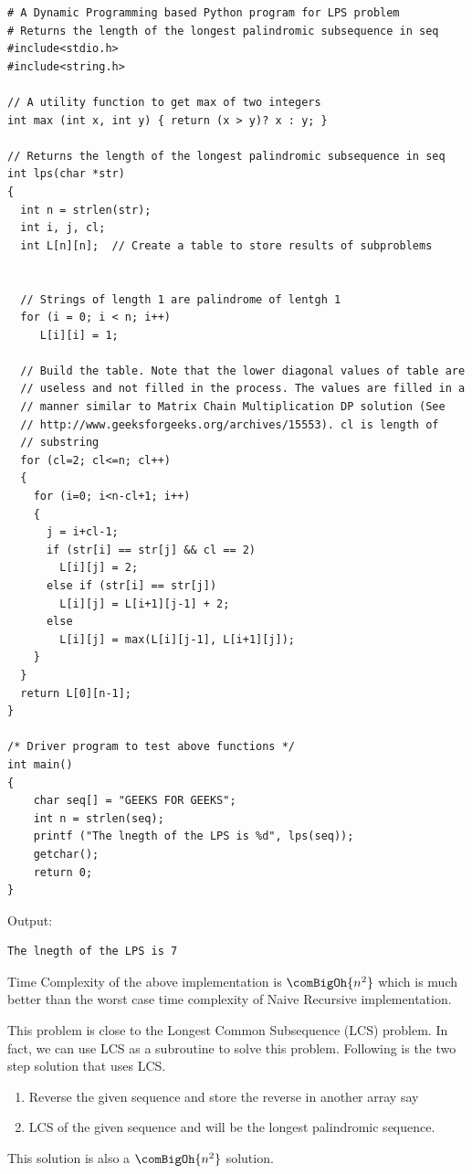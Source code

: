 
\begin{lstlisting}[style=raycppnewsnippet]
# A Dynamic Programming based Python program for LPS problem
# Returns the length of the longest palindromic subsequence in seq
#include<stdio.h>
#include<string.h>
 
// A utility function to get max of two integers
int max (int x, int y) { return (x > y)? x : y; }
 
// Returns the length of the longest palindromic subsequence in seq
int lps(char *str)
{
  int n = strlen(str);
  int i, j, cl;
  int L[n][n];  // Create a table to store results of subproblems
 
 
  // Strings of length 1 are palindrome of lentgh 1
  for (i = 0; i < n; i++)
     L[i][i] = 1;
 
  // Build the table. Note that the lower diagonal values of table are
  // useless and not filled in the process. The values are filled in a
  // manner similar to Matrix Chain Multiplication DP solution (See
  // http://www.geeksforgeeks.org/archives/15553). cl is length of
  // substring
  for (cl=2; cl<=n; cl++)
  {
    for (i=0; i<n-cl+1; i++)
    {
      j = i+cl-1;
      if (str[i] == str[j] && cl == 2)
        L[i][j] = 2;
      else if (str[i] == str[j])
        L[i][j] = L[i+1][j-1] + 2;
      else
        L[i][j] = max(L[i][j-1], L[i+1][j]);
    }
  }
  return L[0][n-1];
}
 
/* Driver program to test above functions */
int main()
{
    char seq[] = "GEEKS FOR GEEKS";
    int n = strlen(seq);
    printf ("The lnegth of the LPS is %d", lps(seq));
    getchar();
    return 0;
}
\end{lstlisting}
Output:
\begin{lstlisting}[style=rayio]
The lnegth of the LPS is 7
\end{lstlisting}
Time Complexity of the above implementation is $\comBigOh{n^2}$ which is
much better than the worst case time complexity of Naive Recursive
implementation.

\begin{mdframed}[style=mdfNOTE,
frametitle={Using LCS}]
This problem is close to the Longest Common Subsequence (LCS) problem. In
fact, we can use LCS as a subroutine to solve this problem. Following is the
two step solution that uses LCS.
\begin{enumerate}[label=\textbf{\arabic*.}]
\item Reverse the given sequence and store the reverse in another array say
\item LCS of the given sequence and  will be the longest
  palindromic sequence.
\end{enumerate}
This solution is also a $\comBigOh{n^2}$ solution.
\end{mdframed}

